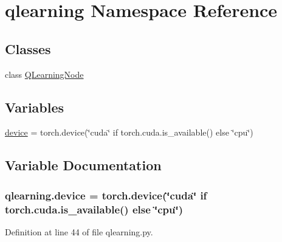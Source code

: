 \hypertarget{namespaceqlearning}{}\section{qlearning Namespace Reference}
\label{namespaceqlearning}
\subsection*{Classes}
\begin{DoxyCompactItemize}
\item 
class \hyperlink{classqlearning_1_1_q_learning_node}{Q\+Learning\+Node}
\end{DoxyCompactItemize}
\subsection*{Variables}
\begin{DoxyCompactItemize}
\item 
\hyperlink{namespaceqlearning_a6034910e71ae6db3114fb7b830d3e45d}{device} = torch.\+device(\char`\"{}cuda\char`\"{} if torch.\+cuda.\+is\+\_\+available() else \char`\"{}cpu\char`\"{})
\end{DoxyCompactItemize}


\subsection{Variable Documentation}
\subsubsection[{\texorpdfstring{device}{device}}]{\setlength{\rightskip}{0pt plus 5cm}qlearning.\+device = torch.\+device(\char`\"{}cuda\char`\"{} if torch.\+cuda.\+is\+\_\+available() else \char`\"{}cpu\char`\"{})}\hypertarget{namespaceqlearning_a6034910e71ae6db3114fb7b830d3e45d}{}\label{namespaceqlearning_a6034910e71ae6db3114fb7b830d3e45d}


Definition at line 44 of file qlearning.\+py.

